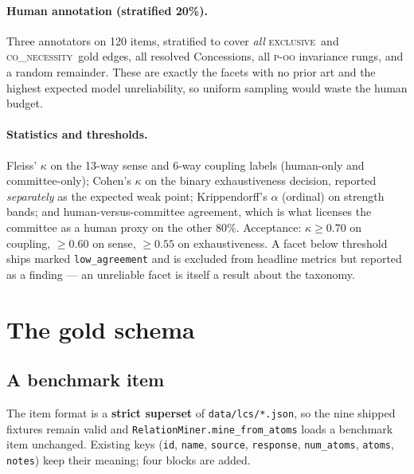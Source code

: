 \documentclass[11pt]{article}
\newcommand{\cExc}{\textsc{exclusive}}
\newcommand{\cCoN}{\textsc{co\_necessity}}
\begin{document}
\paragraph{Human annotation (stratified 20\%).} Three annotators on 120 items, stratified to
cover \emph{all} \cExc\ and \cCoN\ gold edges, all resolved Concessions, all \textsc{p-oo}
invariance rungs, and a random remainder. These are exactly the facets with no prior art
and the highest expected model unreliability, so uniform sampling would waste the human budget.

\paragraph{Statistics and thresholds.} Fleiss' $\kappa$ on the 13-way sense and 6-way coupling
labels (human-only and committee-only); Cohen's $\kappa$ on the binary exhaustiveness decision,
reported \emph{separately} as the expected weak point; Krippendorff's $\alpha$ (ordinal) on
strength bands; and human-versus-committee agreement, which is what licenses the committee as a
human proxy on the other 80\%. Acceptance: $\kappa \geq 0.70$ on coupling, $\geq 0.60$ on
sense, $\geq 0.55$ on exhaustiveness. A facet below threshold ships marked
\texttt{low\_agreement} and is excluded from headline metrics but reported as a finding --- an
unreliable facet is itself a result about the taxonomy.

\section{The gold schema}
\label{sec:schema}

\subsection{A benchmark item}

The item format is a \textbf{strict superset} of \texttt{data/lcs/*.json}, so the nine shipped
fixtures remain valid and \texttt{RelationMiner.mine\_from\_atoms} loads a benchmark item
unchanged. Existing keys (\texttt{id}, \texttt{name}, \texttt{source}, \texttt{response},
\texttt{num\_atoms}, \texttt{atoms}, \texttt{notes}) keep their meaning; four blocks are added.
\end{document}

